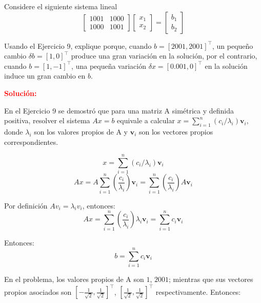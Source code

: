 
Considere el siguiente sistema lineal
\begin{equation}
    \begin{bmatrix}
    1001 & 1000 \\ 
    1000 & 1001
    \end{bmatrix}
    \begin{bmatrix}
    x_1 \\ 
    x_2
    \end{bmatrix} = 
    \begin{bmatrix}
    b_1 \\ 
    b_2
    \end{bmatrix}
\end{equation}

Usando el Ejercicio 9, explique porque, cuando $b=[2001,2001]^{\intercal}$, un pequeño cambio $\delta b=[1,0]^{\intercal}$ produce una gran variación en la solución, por el contrario, cuando $b=[1,-1]^\intercal$, una pequeña variación $\delta x=[0.001,0]^\intercal$ en la solución induce un gran cambio en $b$.

\noindent \textcolor{red}{\bf Solución:}

En el Ejercicio 9 se demostró que para una matriz A simétrica y definida positiva, resolver el sistema $Ax = b$ equivale a calcular $x = \sum_{i=1}^n \left( c_i/\lambda_i \right) \textbf{v}_i$, donde $\lambda_i$ son los valores propios de A y $\textbf{v}_i$ son los vectores propios correspondientes.


\begin{equation}
    x = \sum_{i=1}^n \left( c_i/\lambda_i \right) \textbf{v}_i
\end{equation}
\begin{equation}
    A x = A \sum_{i=1}^n \left( \frac{c_i}{\lambda_i}  \right) \textbf{v}_i
    = \sum_{i=1}^n \left( \frac{c_i}{\lambda_i} \right) A \textbf{v}_i
\end{equation}

Por definición $A v_i = \lambda_i v_i$, entonces:
\begin{equation}
    A x = \sum_{i=1}^n \left( \frac{c_i}{\lambda_i} \right) \lambda_i \textbf{v}_i = \sum_{i=1}^n c_i \textbf{v}_i
\end{equation}

Entonces:
\begin{equation}
    b = \sum_{i=1}^n c_i \textbf{v}_i
\end{equation}

En el problema, los valores propios de A son $1$, $2001$; mientras que sus vectores propios asociados son $[-\frac{1}{\sqrt{2}}, \frac{1}{\sqrt{2}}]^{\intercal}$, $[\frac{1}{\sqrt{2}}, \frac{1}{\sqrt{2}}]^{\intercal}$ respectivamente. Entonces:

